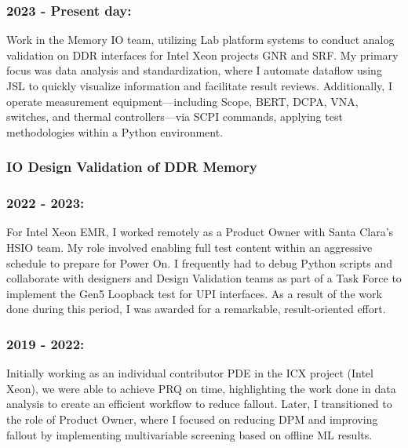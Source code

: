 \documentclass{article}
\begin{document}
\subsubsection{2023 - Present day: }
Work in the Memory IO team, utilizing Lab platform systems to conduct analog validation on DDR interfaces for Intel Xeon projects GNR and SRF. My primary focus was data analysis and standardization, where I automate dataflow using JSL to quickly visualize information and facilitate result reviews. Additionally, I operate measurement equipment—including Scope, BERT, DCPA, VNA, switches, and thermal controllers—via SCPI commands, applying test methodologies within a Python environment.
\subsubsection{IO Design Validation of DDR Memory}
\subsubsection{2022 - 2023: }
For Intel Xeon EMR, I worked remotely as a Product Owner with Santa Clara’s HSIO team. My role involved enabling full test content within an aggressive schedule to prepare for Power On. I frequently had to debug Python scripts and collaborate with designers and Design Validation teams as part of a Task Force to implement the Gen5 Loopback test for UPI interfaces. As a result of the work done during this period, I was awarded for a remarkable, result-oriented effort.
\subsubsection{2019 - 2022: }
Initially working as an individual contributor PDE in the ICX project (Intel Xeon), we were able to achieve PRQ on time, highlighting the work done in data analysis to create an efficient workflow to reduce fallout. Later, I transitioned to the role of Product Owner, where I focused on reducing DPM and improving fallout by implementing multivariable screening based on offline ML results.
\end{document}
